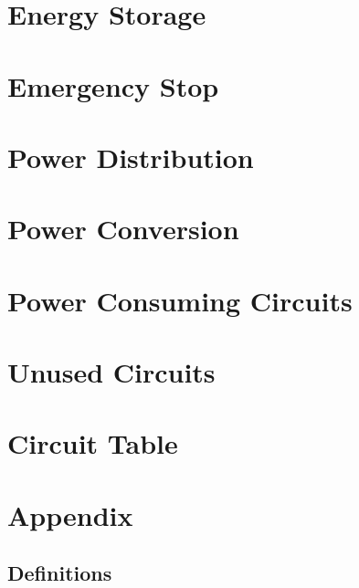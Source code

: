     




\section{Energy Storage}

\section{Emergency Stop}

\section{Power Distribution}

\section{Power Conversion}

\section{Power Consuming Circuits}

\section{Unused Circuits}

\section{Circuit Table}

\section{Appendix}

\subsection{Definitions}

